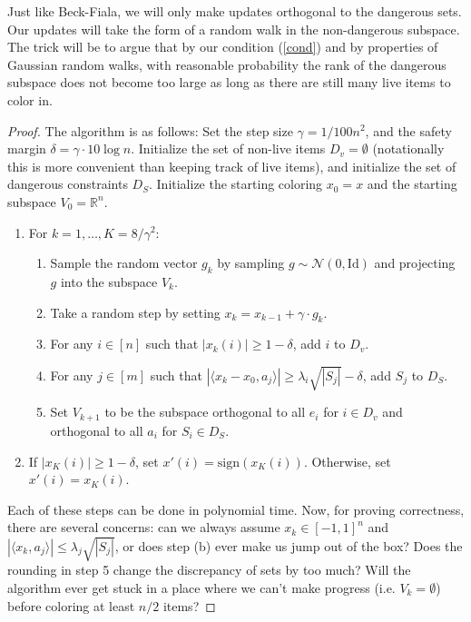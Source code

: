 \documentclass{article}
\theoremstyle{theorem}
\theoremstyle{definition}
\newcommand{\sgn}{\mathrm{sign}}
\newcommand{\R}{\mathbb{R}}
\newcommand{\iprod}[1]{\langle #1 \rangle}
\newcommand{\cN}{\mathcal{N}}
\newcommand{\Id}{\mathrm{Id}}
\begin{document}
Just like Beck-Fiala, we will only make updates orthogonal to the dangerous sets.
Our updates will take the form of a random walk in the non-dangerous subspace.
The trick will be to argue that by our condition (\ref{cond}) and by properties of Gaussian random walks, with reasonable probability the rank of the dangerous subspace does not become too large as long as there are still many live items to color in.
\begin{proof}
The algorithm is as follows:
    Set the step size $\gamma = 1/100n^2$, and the safety margin $\delta = \gamma \cdot 10\log n$.
    Initialize the set of non-live items $D_v = \emptyset $ (notationally this is more convenient than keeping track of live items), and initialize the set of dangerous constraints $D_S$.
    Initialize the starting coloring $x_0 = x$ and the starting subspace $V_0 = \R^n$.
\begin{enumerate}
    \item For $k = 1,\ldots, K= 8/\gamma^2$:
    \begin{enumerate}
	\item Sample the random vector $g_k$ by sampling $g \sim \cN(0, \Id)$ and projecting $g$ into the subspace $V_k$.
	\item Take a random step by setting $x_k = x_{k-1} + \gamma \cdot g_k$.
	\item For any $i \in [n]$ such that $|x_k(i)| \ge 1 - \delta$,  add $i$ to $D_v$.
	\item For any $j \in [m]$ such that $|\langle x_k - x_0, a_j\rangle| \ge \lambda_i\sqrt{|S_j|} - \delta$, add $S_j$ to $D_S$.
	\item Set $V_{k+1}$ to be the subspace orthogonal to all $e_i$ for $i \in D_v$ and orthogonal to all $a_i$ for $S_i \in D_S$.
    \end{enumerate}
\item If $|x_K(i)| \ge 1-\delta$, set $x'(i) = \sgn(x_K(i))$.
    Otherwise, set $x'(i) = x_K(i)$.
\end{enumerate}

Each of these steps can be done in polynomial time.
    Now, for proving correctness, there are several concerns: can we always assume $x_k \in [-1,1]^n$ and $|\iprod{x_k,a_j}|\le \lambda_j\sqrt{|S_j|}$, or does step (b) ever make us jump out of the box?
Does the rounding in step 5 change the discrepancy of sets by too much?
Will the algorithm ever get stuck in a place where we can't make progress (i.e. $V_k = \emptyset$) before coloring at least $n/2$ items?


\end{proof}
\end{document}
